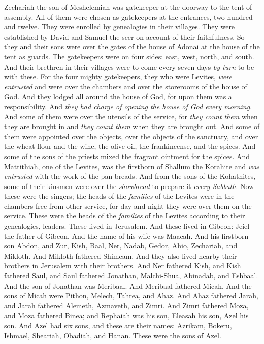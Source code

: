 \begin{biblechapter}
\verse Zechariah the son of Meshelemiah was gatekeeper at the doorway to the tent of assembly.
\verse All of them were chosen as gatekeepers at the entrances, two hundred and twelve. They were enrolled by genealogies in their villages. They were established by David and Samuel the seer on account of their faithfulness.
\verse So they and their sons were over the gates of the house of Adonai at the house of the tent as guards.
\verse The gatekeepers were on four sides: east, west, north, and south.
\verse And their brethren in their villages were to come every seven days \textit{by turn} to be with these.
\verse For the four mighty gatekeepers, they who were Levites, \textit{were entrusted} and were over the chambers and over the storerooms of the house of God.
\verse And they lodged all around the house of God, for upon them was a responsibility. And \textit{they had charge of opening the house of God every morning}.
\verse And some of them were over the utensils of the service, for \textit{they count them} when they are brought in and \textit{they count them} when they are brought out.
\verse And some of them were appointed over the objects, over the objects of the sanctuary, and over the wheat flour and the wine, the olive oil, the frankincense, and the spices.
\verse And some of the sons of the priests mixed the fragrant ointment for the spices.
\verse And Mattithiah, one of the Levites, was the firstborn of Shallum the Korahite and \textit{was entrusted} with the work of the pan breads.
\verse And from the sons of the Kohathites, some of their kinsmen were over the \textit{showbread} to prepare it \textit{every Sabbath}.
\verse Now these were the singers; the heads of the \textit{families} of the Levites were in the chambers free from other service, for day and night they were over them on the service.
\verse These were the heads of the \textit{families} of the Levites according to their genealogies, leaders. These lived in Jerusalem.
 And these lived in Gibeon: Jeiel the father of Gibeon. And the name of his wife was Maacah.
\verse And his firstborn son Abdon, and Zur, Kish, Baal, Ner, Nadab,
\verse Gedor, Ahio, Zechariah, and Mikloth.
\verse And Mikloth fathered Shimeam. And they also lived nearby their brothers in Jerusalem with their brothers.
\verse And Ner fathered Kish, and Kish fathered Saul, and Saul fathered Jonathan, Malchi-Shua, Abinadab, and Eshbaal.
\verse And the son of Jonathan was Meribaal. And Meribaal fathered Micah.
\verse And the sons of Micah were Pithon, Melech, Tahrea, and Ahaz.
\verse And Ahaz fathered Jarah, and Jarah fathered Alemeth, Azmaveth, and Zimri. And Zimri fathered Moza,
\verse and Moza fathered Binea; and Rephaiah was his son, Eleasah his son, Azel his son.
\verse And Azel had six sons, and these are their names: Azrikam, Bokeru, Ishmael, Sheariah, Obadiah, and Hanan. These were the sons of Azel.
\end{biblechapter}

